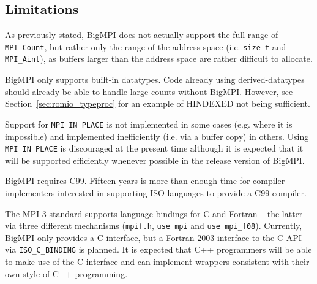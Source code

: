 
\subsection{Limitations}

As previously stated, BigMPI does not actually support the full
range of \texttt{MPI\_Count}, but rather only the range of the
address space (i.e. \texttt{size\_t} and \texttt{MPI\_Aint}), as buffers
larger than the address space are rather difficult to allocate.

BigMPI only supports built-in datatypes.  
Code already using derived-datatypes should already be able 
to handle large counts without BigMPI\@.
However, see Section~\ref{sec:romio_typeproc} 
for an example of HINDEXED not being sufficient.

Support for \texttt{MPI\_IN\_PLACE} is not 
implemented in some cases (e.g. where it is impossible) and 
implemented inefficiently (i.e. via a buffer copy) in others.
Using \texttt{MPI\_IN\_PLACE} is discouraged at the present time
although it is expected that it will be supported efficiently whenever
possible in the release version of BigMPI.

BigMPI requires C99.  Fifteen years is more than enough time for compiler 
implementers interested in supporting ISO languages to provide a C99
compiler.

The MPI-3 standard supports language bindings for C and Fortran --
the latter via three different mechanisms
(\texttt{mpif.h}, \texttt{use mpi} and \texttt{use mpi\_f08}).
Currently, BigMPI only provides a C interface, but a Fortran 2003
interface to the C API via \texttt{ISO\_C\_BINDING} is planned.
It is expected that C++ programmers will be able to make use of the
C interface and can implement wrappers consistent with their own
style of C++ programming.